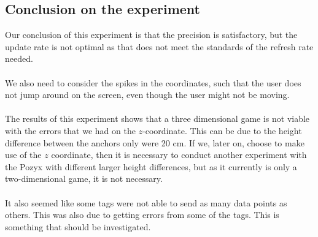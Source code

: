 \subsection{Conclusion on the experiment}
Our conclusion of this experiment is that the precision is satisfactory, but the update rate is not optimal as that does not meet the standards of the refresh rate needed.
\\\\
We also need to consider the spikes in the coordinates, such that the user does not jump around on the screen, even though the user might not be moving.
\\\\
The results of this experiment shows that a three dimensional game is not viable with the errors that we had on the $z$-coordinate. 
This can be due to the height difference between the anchors only were 20 cm.
If we, later on, choose to make use of the $z$ coordinate, then it is necessary to conduct another experiment with the Pozyx with different larger height differences, but as it currently is only a two-dimensional game, it is not necessary.
\\\\
It also seemed like some tags were not able to send as many data points as others. This was also due to getting errors from some of the tags.
This is something that should be investigated.
